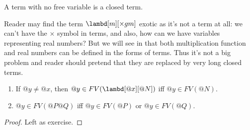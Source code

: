 \documentclass[../../../include/open-logic-section]{subfiles}
\begin{document}
\begin{defn}
  A term with no free variable is a closed term.
\end{defn}

\begin{ex}
  Reader may find the term $\lambd[m][\times g m]$ exotic as it's not
  a term at all: we can't have the $\times$ symbol in terms, and also,
  how can we have variables representing real numbers? But we will see
  in \olref[lc][rep] that both multiplication function and real
  numbers can be defined in the forms of terms. Thus it's not a big
  problem and reader should pretend that they are replaced by very
  long closed terms.
\end{ex}

\begin{lem}
  \begin{enumerate}
    \item {} If $@y \neq @x$, then $@y \in FV(\lambd[@x][@N])$ iff $@y \in
    FV(@N)$.
    \item {} $@y \in FV(@P@Q)$ iff $@y \in FV(@P)$ or
      $@y \in FV(@Q)$.
    \end{enumerate}
\end{lem}
\begin{proof}
  Left as exercise.
\end{proof}
\end{document}
